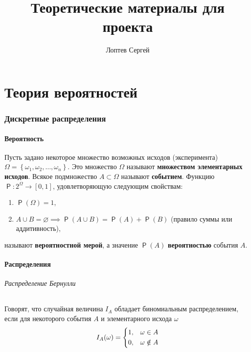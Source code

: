 \documentclass[12pt]{article}
\title {Теоретические материалы для проекта}
\author {Лоптев Сергей}
\DeclareMathOperator{\prob}{\mathsf{P}}
\begin{document}
    \maketitle     
    \tableofcontents
    \newpage
    
    \part{Теория вероятностей}
    \section{Дискретные распределения}
    \subsection{Вероятность}
    Пусть задано некоторое множество возможных исходов (эксперимента) $\Omega = \left\{\omega_1, \omega_2, \ldots, \omega_n\right\}$. Это множество $\Omega$ называют \textbf{множеством элементарных исходов}. Всякое подмножество $A \subset \Omega$ называют \textbf{событием}. Функцию $\prob : 2^{\Omega} \to \left[0, 1\right]$, удовлетворяющую следующим свойствам:
    \begin{enumerate}[label=(\roman*)]
        \item $\prob(\Omega) = 1$,
        \item $A \cup B = \varnothing \implies \prob(A \cup B) = \prob(A) + \prob(B)$ (правило суммы или аддитивность),
    \end{enumerate} 
    называют \textbf{вероятностной мерой}, а значение $\prob(A)$ \textbf{вероятностью} события $A$.
    \subsection{Распределения}
    \paragraph{Распределение Бернулли}
    Говорят, что случайная величина $I_A$ обладает биномиальным распределением, если для некоторого события $A$ и элементарного исхода $\omega$
    \begin{equation*}
        I_A(\omega) = \begin{dcases}
            1, &\omega \in A\\
            0, &\omega \notin A
        \end{dcases}
    \end{equation*}
    
\end{document}
